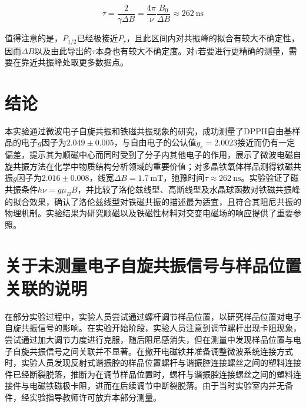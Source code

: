 \documentclass{thuemp}
\begin{document}
    \begin{equation}
        \tau = \frac{2}{\gamma\Delta B}
             = \frac{4\pi}{\nu}\frac{B_0}{\Delta B}
             \approx 262 ~ \text{ns}
    \end{equation}
    
    值得注意的是，$P_{1/2}$已经极接近$P_r$，且此区间内对共振峰的拟合有较大不确定性，因而$\Delta B$以及由此导出的$\tau$本身也有较大不确定度。对$\tau$若要进行更精确的测量，需要在靠近共振峰处取更多数据点。
    
    \section{结论}
    
    本实验通过微波电子自旋共振和铁磁共振现象的研究，成功测量了DPPH自由基样品的电子$g$因子为$2.049 \pm 0.005$，与自由电子的公认值$g_e=2.0023$接近而仍有一定偏差，提示其为顺磁中心而同时受到了分子内其他电子的作用，展示了微波电磁自旋共振方法在化学中物质结构分析领域的重要价值；对多晶铁氧体样品测得铁磁共振$g$因子为$2.016 \pm 0.008$，线宽$\Delta B = \SI{1.7}{\milli\tesla}$，弛豫时间$\tau \approx \SI{262}{\nano\second}$。实验验证了磁共振条件$h\nu = g\mu_B B$，并比较了洛伦兹线型、高斯线型及水晶球函数对铁磁共振峰的拟合效果，确认了洛伦兹线型对铁磁共振的描述最为适宜，且符合其阻尼共振的物理机制。实验结果为研究顺磁以及铁磁性材料对交变电磁场的响应提供了重要参照。
    
    
    
    \renewcommand\refname{\heiti\wuhao\centerline{参考文献}\global\def\refname{参考文献}}
    \vskip 12pt
    
    \let\OLDthebibliography\thebibliography
    \renewcommand\thebibliography[1]{
      \OLDthebibliography{#1}
      \setlength{\parskip}{0pt}
      \setlength{\itemsep}{0pt plus 0.3ex}
    }
    
    {
    \renewcommand{\baselinestretch}{0.9}
    \liuhao
    
    
    }
    \newpage
    \appendix
    
    \section{关于未测量电子自旋共振信号与样品位置关联的说明}
    
    在部分实验过程中，实验人员尝试通过螺杆调节样品位置，以研究样品位置对电子自旋共振信号的影响。在实验开始阶段，实验人员注意到调节螺杆出现卡阻现象，尝试通过加大调节力度进行克服，随后阻尼感消失，但在测量中发现样品位置与电子自旋共振信号之间关联并不显著。在撤开电磁铁并准备调整微波系统连接方式时，实验人员发现反射式谐振腔的样品位置螺杆与谐振腔连接螺丝之间的塑料连接件已经断裂脱落，推断为在调节样品位置时，螺杆与谐振腔连接螺丝之间的塑料连接件与电磁铁磁极卡阻，进而在后续调节中断裂脱落。由于当时实验室内并无备件，经实验指导教师许可放弃本部分测量。
    
\end{document}
